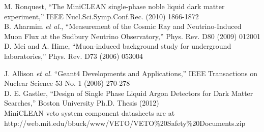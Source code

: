 \documentclass[preprint,12pt]{elsarticle}
\begin{document}
\begin{thebibliography}{999}

M. Ronquest, ``The MiniCLEAN single-phase noble liquid dark matter experiment,'' IEEE Nucl.Sci.Symp.Conf.Rec. (2010) 1866-1872 \\

B. Aharmim {\it et al.}, ``Measurement of the Cosmic Ray and Neutrino-Induced Muon Flux at the Sudbury Neutrino Observatory,'' Phys. Rev. D80 (2009) 012001 \\

D. Mei and A. Hime, ``Muon-induced background study for underground laboratories,'' Phys. Rev. D73 (2006) 053004

J. Allison {\it et al.} ``Geant4 Developments and Applications,'' IEEE Transactions on Nuclear Science 53 No. 1 (2006) 270-278 \\

D. E. Gastler, ``Design of Single Phase Liquid Argon Detectors for Dark Matter Searches,'' Boston University Ph.D. Thesis (2012) \\

 MiniCLEAN veto system component datasheets are at http://web.mit.edu/bbuck/www/VETO/VETO\%20Safety\%20Documents.zip \\

\end{thebibliography}
\end{document}
